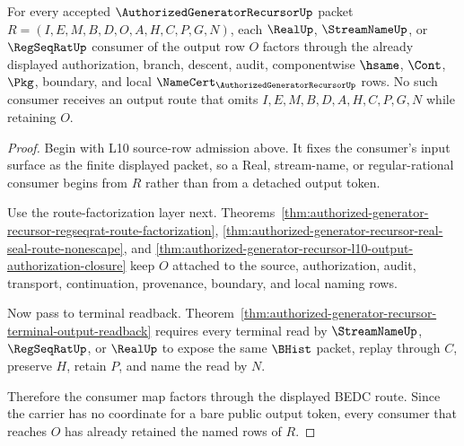 \begin{theorem}
\label{thm:authorized-generator-recursor-l10-real-stream-output-factorization}
For every accepted $\AuthorizedGeneratorRecursorUp$ packet $R=(I,E,M,B,D,O,A,H,C,P,G,N)$, each $\RealUp$, $\StreamNameUp$, or $\RegSeqRatUp$ consumer of the output row $O$ factors through the already displayed authorization, branch, descent, audit, componentwise $\hsame$, $\Cont$, $\Pkg$, boundary, and local $\NameCert_{\AuthorizedGeneratorRecursorUp}$ rows. No such consumer receives an output route that omits $I,E,M,B,D,A,H,C,P,G,N$ while retaining $O$.
\end{theorem}
\begin{proof}
Begin with L10 source-row admission above. It fixes the consumer's input surface as the finite displayed packet, so a Real, stream-name, or regular-rational consumer begins from $R$ rather than from a detached output token.

Use the route-factorization layer next. Theorems~\ref{thm:authorized-generator-recursor-regseqrat-route-factorization}, \ref{thm:authorized-generator-recursor-real-seal-route-nonescape}, and \ref{thm:authorized-generator-recursor-l10-output-authorization-closure} keep $O$ attached to the source, authorization, audit, transport, continuation, provenance, boundary, and local naming rows.

Now pass to terminal readback. Theorem~\ref{thm:authorized-generator-recursor-terminal-output-readback} requires every terminal read by $\StreamNameUp$, $\RegSeqRatUp$, or $\RealUp$ to expose the same $\BHist$ packet, replay through $C$, preserve $H$, retain $P$, and name the read by $N$.

Therefore the consumer map factors through the displayed BEDC route. Since the carrier has no coordinate for a bare public output token, every consumer that reaches $O$ has already retained the named rows of $R$.
\end{proof}

